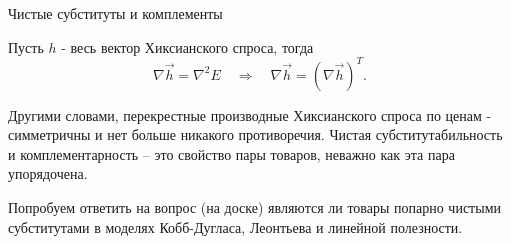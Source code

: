 \documentclass{beamer}
\begin{document}
\begin{frame}{Чистые субституты и комплементы}

\begin{lemma}
Пусть $h$ - весь вектор Хиксианского спроса, тогда
$$ \nabla \vec h = \nabla^2 E \quad \Rightarrow \quad \nabla \vec h = (\nabla \vec h)^T.$$
\end{lemma}

Другими словами, перекрестные производные Хиксианского спроса по ценам - симметричны и нет больше никакого противоречия. Чистая субститутабильность и комплементарность – это свойство пары товаров, неважно как эта пара упорядочена.

Попробуем ответить на вопрос (на доске) являются ли товары попарно чистыми субститутами в моделях Кобб-Дугласа, Леонтьева и линейной полезности.

\end{frame}
%
%
%
%
%
%
%
%
%
%
%
%
%
\end{document}
